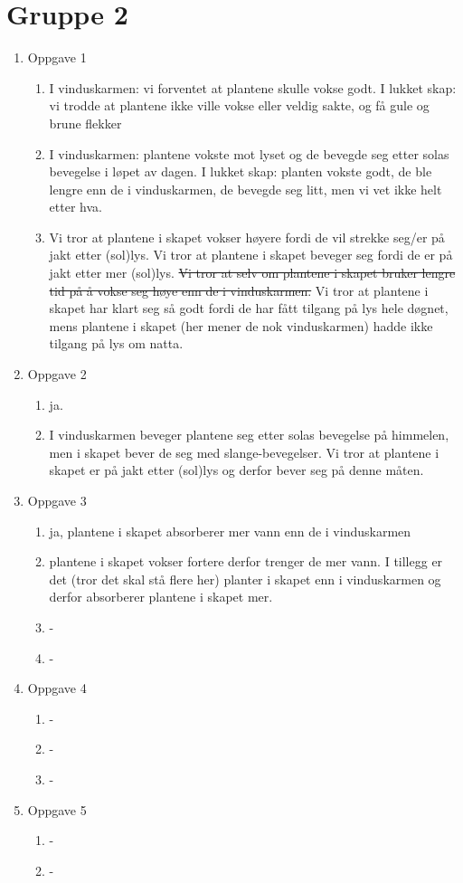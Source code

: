 \section{Gruppe 2}
\begin{enumerate}
	\item Oppgave 1
	\begin{enumerate}
		\item I vinduskarmen: vi forventet at plantene skulle vokse godt. I lukket skap: vi trodde at plantene ikke ville vokse eller veldig sakte, og få gule og brune flekker
		\item I vinduskarmen: plantene vokste mot lyset og de bevegde seg etter solas bevegelse i løpet av dagen. I lukket skap: planten vokste godt, de ble lengre enn de i vinduskarmen, de bevegde seg litt, men vi vet ikke helt etter hva.
		\item Vi tror at plantene i skapet vokser høyere fordi de vil strekke seg/er på jakt etter (sol)lys. Vi tror at plantene i skapet beveger seg fordi de er på jakt etter mer (sol)lys. \sout{Vi tror at selv om plantene i skapet bruker lengre tid på å vokse seg høye enn de i vinduskarmen.} Vi tror at plantene i skapet har klart seg så godt fordi de har fått tilgang på lys hele døgnet, mens plantene i skapet (her mener de nok vinduskarmen) hadde ikke tilgang på lys om natta.
	\end{enumerate}

	\item Oppgave 2
	\begin{enumerate}
		\item ja.
		\item I vinduskarmen beveger plantene seg etter solas bevegelse på himmelen, men i skapet bever de seg med slange-bevegelser. Vi tror at plantene i skapet er på jakt etter (sol)lys og derfor bever seg på denne måten.
	\end{enumerate}	

	\item Oppgave 3
	\begin{enumerate}
		\item ja, plantene i skapet absorberer mer vann enn de i vinduskarmen
		\item plantene i skapet vokser fortere derfor trenger de mer vann. I tillegg er det (tror det skal stå flere her) planter i skapet enn i vinduskarmen og derfor absorberer plantene i skapet mer.
		\item -
		\item -
	\end{enumerate}

	\item Oppgave 4
	\begin{enumerate}
		\item -
		\item -
		\item -
	\end{enumerate}

	\item Oppgave 5
	\begin{enumerate}
		\item -
		\item -
	\end{enumerate}
\end{enumerate}

